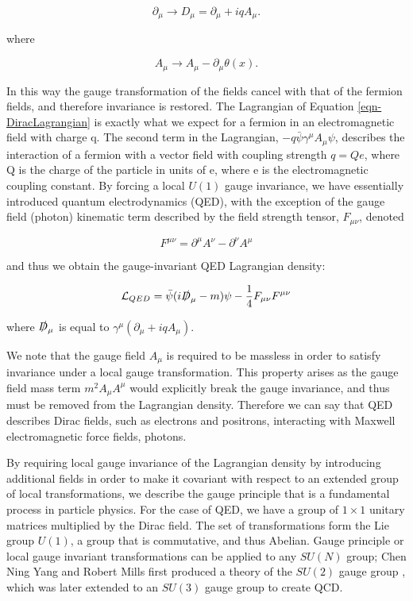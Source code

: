 \begin{equation}
\partial_{\mu} \to D_{\mu} = \partial_{\mu} + iqA_{\mu}.
\end{equation}

where

\begin{equation}
A_{\mu} \to A_{\mu} - \partial_{\mu} \theta (x).
\end{equation}

In this way the gauge transformation of the fields cancel with that of the fermion fields, and therefore invariance is restored. The Lagrangian of Equation \ref{eqn-DiracLagrangian} is exactly what we expect for a fermion in an electromagnetic field with charge q. The second term in the Lagrangian, $-q\bar{\psi}\gamma^{\mu}A_{\mu}\psi$, describes the interaction of a fermion with a vector field with coupling strength $q=Qe$, where Q is the charge of the particle in units of e, where e is the electromagnetic coupling constant. By forcing a local $U(1)$ gauge invariance, we have essentially introduced quantum electrodynamics (QED), with the exception of the gauge field (photon) kinematic term described by the field strength tensor, $F_{\mu \nu}$, denoted  

\begin{equation}
F^{\mu \nu} = \partial^{\mu}A^{\nu} - \partial^{\nu}A^{\mu}
\end{equation}

and thus we obtain the gauge-invariant QED Lagrangian density:

\begin{equation}
\mathcal{L}_{QED} = \bar{\psi}(i \slashed{D}_{\mu} - m) \psi - \frac{1}{4}F_{\mu \nu}F^{\mu \nu}
\end{equation}

where $\slashed{D}_{\mu}$ is equal to $\gamma^{\mu}(\partial_{\mu} + iqA_{\mu})$.

We note that the gauge field $A_{\mu}$ is required to be massless in order to satisfy invariance under a local gauge transformation. This property arises as the gauge field mass term $m^2A_{\mu}A^{\mu}$ would explicitly break the gauge invariance, and thus must be removed from the Lagrangian density. Therefore we can say that QED describes Dirac fields, such as electrons and positrons, interacting with Maxwell electromagnetic force fields, photons.

By requiring local gauge invariance of the Lagrangian density by introducing additional fields in order to make it covariant with respect to an extended group of local transformations, we describe the gauge principle that is a fundamental process in particle physics. For the case of QED, we have a group of $1 \times 1$ unitary matrices multiplied by the Dirac field. The set of transformations form the Lie group $U(1)$, a group that is commutative, and thus Abelian. Gauge principle or local gauge invariant transformations can be applied to any $SU(N)$ group; Chen Ning Yang and Robert Mills first produced a theory of the $SU(2)$ gauge group \cite{PhysRev.96.191}, which was later extended to an $SU(3)$ gauge group to create QCD.  

